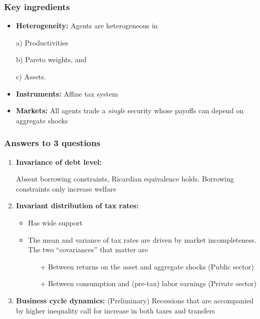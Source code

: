 \documentclass{beamer}
\begin{document}
\begin{frame}
\frametitle{Key ingredients}


\begin{itemize}
\vspace{3mm}
 \item \textbf{Heterogeneity:} Agents are heterogeneous in 

 \vspace{2mm}
 a) Productivities 
 
 b) Pareto weights, and  
 
 c) Assets. 
 \vspace{3mm}
 \item \textbf{Instruments:} Affine tax system 
 \vspace{3mm}
 \item \textbf{Markets:} All agents trade a \emph{single} security whose payoffs can depend on aggregate shocks
\end{itemize}


\end{frame}

\begin{frame}
 \frametitle{Answers to 3 questions}
 
\begin{enumerate}
\item \textbf{Invariance of  debt level:} 

Absent borrowing constraints, Ricardian equivalence holds. Borrowing constraints only increase welfare

\item \textbf{Invariant distribution of tax rates:} 

\begin{itemize}
	\item Has wide support
       \item The mean and variance of tax rates are driven by market incompleteness. The two ``covariances'' that matter are 
       \begin{itemize}
        \item [+]  Between returns on the asset and aggregate shocks (Public sector)
        \item [+]  Between consumption and (pre-tax) labor earnings (Private sector)
       \end{itemize}
\end{itemize}



\item \textbf{Business cycle dynamics:} (Preliminary) 
Recessions that are accompanied by higher inequality call for increase in both taxes and transfers
\end{enumerate}



\end{frame}
\end{document}
